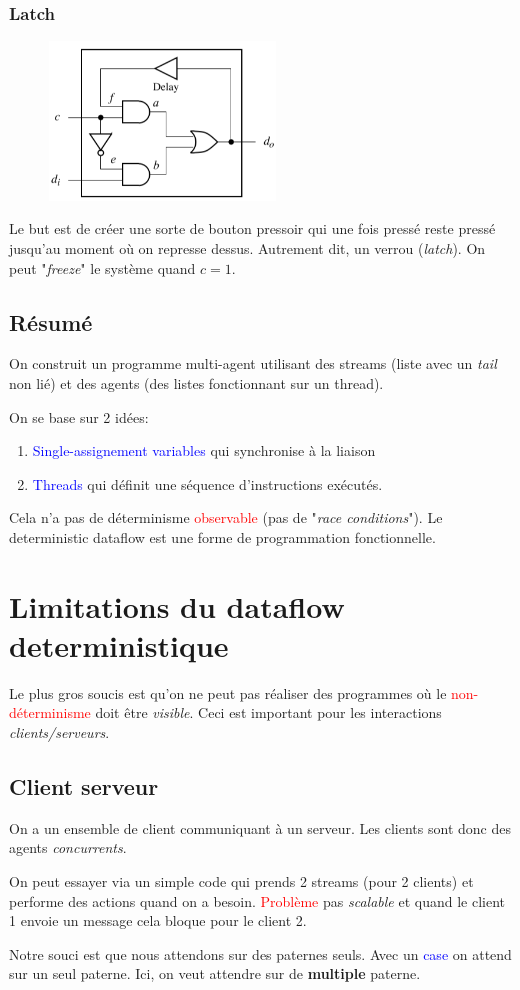 \documentclass{report}
\begin{document}
\subsubsection{Latch}
\begin{figure}[H]
\centering
\includegraphics[width=6cm]{img/latch.png}
\end{figure}
Le but est de créer une sorte de bouton pressoir qui une fois pressé reste pressé jusqu'au moment où on represse dessus. Autrement dit, un verrou (\textit{latch}). On peut "\textit{freeze}" le système quand $c = 1$.

\subsection{Résumé}
On construit un programme multi-agent utilisant des streams (liste avec un \textit{tail} non lié) et des agents (des listes fonctionnant sur un thread).\par
On se base sur 2 idées:
\begin{enumerate}
\item \textcolor{blue}{Single-assignement variables} qui synchronise à la liaison
\item \textcolor{blue}{Threads} qui définit une séquence d'instructions exécutés.
\end{enumerate}
Cela n'a pas de déterminisme \textcolor{red}{observable} (pas de "\textit{race conditions}"). Le deterministic dataflow est une forme de programmation fonctionnelle.

\section{Limitations du dataflow deterministique}
Le plus gros soucis est qu'on ne peut pas réaliser des programmes où le \textcolor{red}{non-déterminisme} doit être \textit{visible}. Ceci est important pour les interactions \textit{clients/serveurs}.

\subsection{Client serveur}
On a un ensemble de client communiquant à un serveur. Les clients sont donc des agents \textit{concurrents}. \par 
On peut essayer via un simple code qui prends 2 streams (pour 2 clients) et performe des actions quand on a besoin. \textcolor{red}{Problème} pas \textit{scalable} et quand le client 1 envoie un message cela bloque pour le client 2.\par 
Notre souci est que nous attendons sur des paternes seuls. Avec un \textcolor{blue}{case} on attend sur un seul paterne. Ici, on veut attendre sur de \textbf{multiple} paterne.
\end{document}

